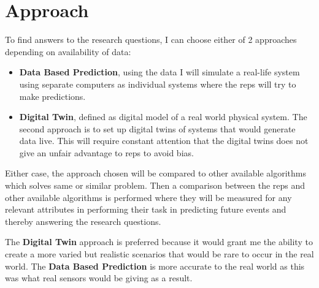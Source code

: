 \documentclass[a4paper,8pt]{article}
\begin{document}
	\section{Approach}
		To find answers to the research questions, I can choose either of 2 approaches depending on availability of data: 
		\begin{itemize}
			\item \textbf{Data Based Prediction}, using the data I will simulate a real-life system using separate computers as individual systems where the \gls{reps} will try to make predictions.
			\item \textbf{Digital Twin}, defined as digital model of a real world physical system. The second approach is to set up digital twins of systems that would generate data live. This will require constant attention that the digital twins does not give an unfair advantage to \gls{reps} to avoid bias.
		\end{itemize}
		Either case, the approach chosen will be compared to other available algorithms which solves same or similar problem.
		Then a comparison between the \gls{reps} and other available algorithms is performed where they will be measured for any relevant attributes in performing their task in predicting future events and thereby answering the research questions.
		
		The \textbf{Digital Twin} approach is preferred because it would grant me the ability to create a more varied but realistic scenarios that would be rare to occur in the real world. The \textbf{Data Based Prediction} is more accurate to the real world as this was what real sensors would be giving as a result.
\end{document}
